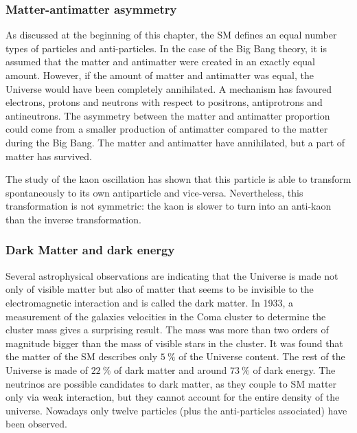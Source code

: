       \subsubsection{Matter-antimatter asymmetry}

      As discussed at the beginning of this chapter, the \gls{SM} defines an equal number types of particles and anti-particles. 
      In the case of the Big Bang theory, it is assumed that the matter and antimatter were created in an exactly equal amount.
      However, if the amount of matter and antimatter was equal, the Universe would have been completely annihilated.
      A mechanism has favoured electrons, protons and neutrons with respect to positrons, antiprotrons and antineutrons.
      The asymmetry between the matter and antimatter proportion could come from a smaller production of antimatter compared to the matter during the Big Bang.
      The matter and antimatter have annihilated, but a part of matter has survived. 

      The study of the kaon oscillation has shown that this particle is able to transform spontaneously to its own antiparticle and vice-versa.
      Nevertheless, this transformation is not symmetric: the kaon is slower to turn into an anti-kaon than the inverse transformation.

      \subsubsection{Dark Matter and dark energy}
      
      Several astrophysical observations are indicating that the Universe is made not only of visible matter but also of matter that seems to be invisible to the electromagnetic interaction and is called the dark matter.
      In 1933, a measurement of the galaxies velocities in the Coma cluster to determine the cluster mass gives a surprising result.
      The mass was more than two orders of magnitude bigger than the mass of visible stars in the cluster.
      It was found that the matter of the \gls{SM} describes only $5~\%$ of the Universe content. 
      The rest of the Universe is made of $22~\%$ of dark matter and around $73~\%$ of dark energy.
      The neutrinos are possible candidates to dark matter, as they couple to \gls{SM} matter only via weak interaction, but they cannot account for the entire density of the universe.
      Nowadays only twelve particles (plus the anti-particles associated) have been observed. 

